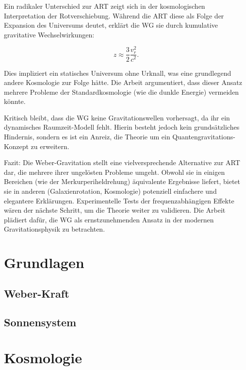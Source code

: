 \documentclass{book}
\numberwithin{equation}{section}
\begin{document}
Ein radikaler Unterschied zur ART zeigt sich in der kosmologischen Interpretation der Rotverschiebung. Während die ART diese als Folge der Expansion des Universums deutet,
erklärt die WG sie durch kumulative gravitative Wechselwirkungen:

\[
z \approx \frac{3}{2} \frac{v_r^2}{c^2}.
\]  

Dies impliziert ein statisches Universum ohne Urknall, was eine grundlegend andere Kosmologie zur Folge hätte. Die Arbeit argumentiert, dass dieser Ansatz mehrere Probleme
der Standardkosmologie (wie die dunkle Energie) vermeiden könnte.  

Kritisch bleibt, dass die WG keine Gravitationswellen vorhersagt, da ihr ein dynamisches Raumzeit-Modell fehlt. Hierin besteht jedoch kein grundsätzliches Hindernis,
sondern es ist ein Anreiz, die Theorie um ein Quantengravitations-Konzept zu erweitern.

Fazit: Die Weber-Gravitation stellt eine vielversprechende Alternative zur ART dar, die mehrere ihrer ungelösten Probleme umgeht. Obwohl sie in einigen Bereichen
(wie der Merkurperiheldrehung) äquivalente Ergebnisse liefert, bietet sie in anderen (Galaxienrotation, Kosmologie) potenziell einfachere und elegantere Erklärungen.
Experimentelle Tests der frequenzabhängigen Effekte wären der nächste Schritt, um die Theorie weiter zu validieren. Die Arbeit plädiert dafür, die WG als
ernstzunehmenden Ansatz in der modernen Gravitationsphysik zu betrachten.

\tableofcontents

\part{Grundlagen}
\chapter{Weber-Kraft}





\chapter{Sonnensystem}



\part{Kosmologie}



\end{document}
